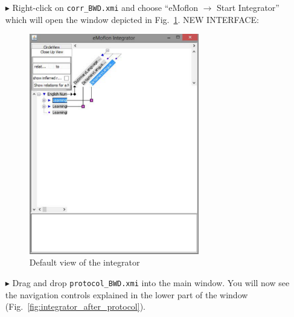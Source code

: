 \begin{itemize}

\item[$\blacktriangleright$] Right-click on \texttt{corr\_BWD.xmi} and choose ``eMoflon $\rightarrow$ Start Integrator'' which will open the window depicted in
Fig.~\ref{fig:integrator_start}. \update NEW INTERFACE:

\begin{figure}[htbp]
\begin{center}
  \includegraphics[width=0.7\textwidth]{integrator_start_view.pdf}
  \caption{Default view of the integrator}
  \label{fig:integrator_start}
\end{center}
\end{figure}

\item[$\blacktriangleright$] Drag and drop \texttt{protocol\_BWD.xmi} into the main window. You will now see the navigation controls explained in the lower part
of the window (Fig.~\ref{fig:integrator_after_protocol}).


\end{itemize}
